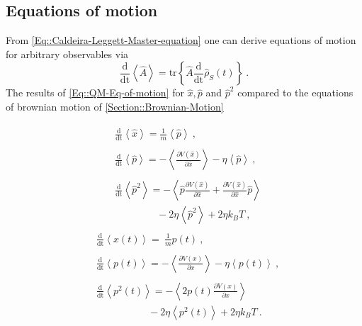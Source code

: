 	\subsection{Equations of motion}
	From \autoref{Eq::Caldeira-Leggett-Master-equation} one can derive equations of motion for arbitrary observables via
	\begin{equation}\label{Eq::QM-Eq-of-motion}
		\frac{\text{d}}{\text{dt}} \left \langle \hat{A} \right \rangle =	\text{tr} \left\{\hat{A} \frac{\text{d}}{\text{dt} } \hat{\rho}_S(t)\right\}~.
	\end{equation}
	The results of \autoref{Eq::QM-Eq-of-motion} for $\hat{x}, \hat{p}$ and $\hat{p}^2$ compared to the equations of brownian motion of \autoref{Section::Brownian-Motion}
	\begin{multicols}{2}
		\noindent
		\begin{align*}
			\begin{split}
				&\frac{\text{d}}{\text{dt}} \left \langle \hat{x} \right \rangle =	\frac{1}{m} \left\langle \hat{p} \right \rangle~,
			\end{split}
			\\
			\begin{split}
				&\frac{\text{d}}{\text{dt}} \left \langle \hat{p} \right \rangle = - 	\left\langle  \frac{\partial V(\hat{x})}{\partial \hat{x}} \right \rangle - \eta \left \langle \hat{p} \right \rangle ~,
			\end{split}
			\\
			\begin{split}
				&\frac{\text{d}}{\text{dt}} \left \langle \hat{p}^2 \right \rangle =	- \left\langle \hat{p} \frac{\partial V(\hat{x})}{\partial \hat{x}} + \frac{\partial V(\hat{x})}{\partial \hat{x}} \hat{p} \right \rangle \\
				&\qquad \qquad ~- 2 \eta \left \langle \hat{p}^2 \right \rangle + 2 \eta k_B T ~,
			\end{split}
		\end{align*}
		\begin{align*}
			\begin{split}
				&\frac{\text{d}}{\text{dt}} \left \langle {x}(t) \right \rangle  =	~\frac{1}{m} {p}(t) ~,
			\end{split}
			\\
			\begin{split}
				&\frac{\text{d}}{\text{dt}} \left \langle {p}(t) \right \rangle =	- 	\left \langle \frac{\partial V({x})}{\partial {x}} \right \rangle - \eta \left \langle {p}(t) \right \rangle ~,
			\end{split}
			\\
			\begin{split}
				&\frac{\text{d}}{\text{dt}} \left \langle {p}^2(t) \right \rangle = - \left\langle 2 {p}(t) \frac{\partial V({x})}{\partial {x}}\right \rangle \\
				&\qquad \qquad \quad ~ - 2 \eta \left \langle {p}^2(t) \right \rangle + 2 \eta k_B T~.
			\end{split}
		\end{align*}
	\end{multicols}
